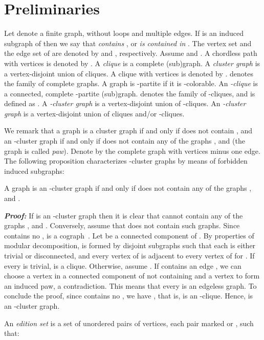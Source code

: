 \documentclass[12pt]{article}
\def\qed{ \fbox \par \medskip }
\def\qed2{ \hfill \framebox[.09in] \par \bigskip }
\begin{document}
\section{Preliminaries} \label{sec2}

Let  denote a finite graph, without loops and multiple edges.
If  is an induced subgraph of  then we say that  {\it contains} , or  {\it is contained in} .
The vertex set and the edge set of  are denoted by  and , respectively.
Assume  and . A chordless path with  vertices is denoted by .
A \emph{clique} is a complete (sub)graph.  A \emph{cluster graph} is a vertex-disjoint union of cliques.
A clique with  vertices is denoted by .  denotes the family of complete graphs.
A graph is -partite if it is -colorable.
An \emph{-clique} is a connected, complete -partite (sub)graph.
 denotes the family of -cliques, and  is defined as .
A \emph{-cluster graph} is a vertex-disjoint union of -cliques.
An \emph{-cluster graph} is a vertex-disjoint union of cliques and/or -cliques.

We remark that a graph  is a cluster graph if and only if  does not contain ,
and an -cluster graph if and only if  does not contain any of the graphs
,  and  (the graph 
is called {\em paw}). Denote by  the complete graph with  vertices minus one edge.
The following proposition characterizes -cluster graphs by means of forbidden induced subgraphs:

\begin{prop} \label{forbidden}
A graph  is an -cluster graph if and only if  does
not contain any of the graphs ,  and .
\end{prop}



\noindent
\emph{\textbf{Proof:}} If  is an -cluster graph then it is clear that  cannot contain
any of the graphs ,  and . Conversely, assume that
 does not contain such graphs. Since  contains no ,
 is a cograph~\cite{CLB81}. Let  be a connected component of . By properties of modular decomposition,  is formed
by disjoint subgraphs  such that each  is either trivial or disconnected,
and every vertex of  is adjacent to every vertex of  for .
If every  is trivial,  is a clique. Otherwise, assume . If  contains an
edge , we can choose a vertex  in a connected component of  not containing  and a vertex 
to form an induced paw, a contradiction. This means that every  is an edgeless graph. To conclude the proof,
since  contains no ,  we have , that is,  is an -clique. Hence,
 is an -cluster graph.  \qed2

An \emph{edition set}  is a set of unordered pairs of
vertices, each pair marked  or , such that:
\end{document}
